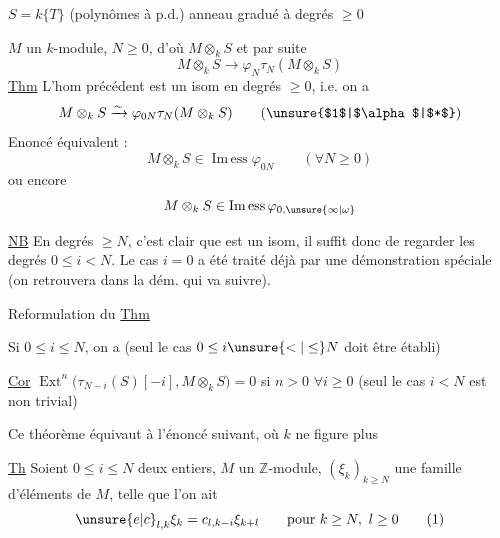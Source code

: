 $S=k\{T\}$ (polynômes à p.d.) anneau gradué à degrés $\geq0$

$M$ un $k$-module, $N\geq0$, d'où $M\otimes_k S$ et par suite
\[
M\otimes_k S\longrightarrow\varphi_N\tau_N(M\otimes_k S)
\]
\uline{Thm} L'hom précédent est un isom en degrés $\geq0$, i.e. on a
\[
M\otimes_k S\xrightarrow{\sim}\varphi_{0N}\tau_N(M\otimes_k S)\tag*{(\unsure{$1$|$\alpha$|$*$})}
\]
Enoncé équivalent :
\[
M\otimes_k S\in\operatorname{Im\,ess}\varphi_{0N}\qquad(\forall N\geq0)
\]
ou encore
\[
M\otimes_k S\in\operatorname{Im\,ess}\varphi_{0,\unsure{\infty|\omega}}
\]

\uline{NB} En degrés $\geq N$, c'est clair que  est un isom, il suffit donc de regarder les degrés $0\leq i<N$. Le cas $i=0$ a été traité déjà par une démonstration spéciale (on  retrouvera dans la dém. qui va suivre).

Reformulation du \uline{Thm}

Si $0\leq i\leq N$, on a
(seul le cas $0\leq i\unsure{<|\leq}N$ doit être établi)

\uline{Cor} $\operatorname{Ext}^n\bigl(\tau_{N-i}(S)[-i],M\otimes_k S\bigr)=0$ si $n>0$ $\forall i\geq0$ (seul le cas $i<N$ est non trivial)

Ce théorème équivaut à l'énoncé suivant, où $k$ ne figure plus

\uline{Th} Soient $0\leq i\leq N$ deux entiers, $M$ un $\mathbb{Z}$-module, $(\xi_k)_{k\geq N}$ une famille d'éléments de $M$, telle que l'on ait
\[
\unsure{e|c}_{l,k}\xi_k=c_{l,k-i}\xi_{k+l}\qquad\text{pour }k\geq N,\ l\geq0\tag*{(1)}
\]

